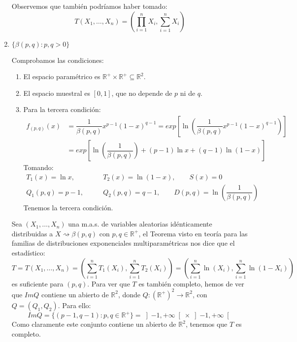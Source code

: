 \begin{ejercicio}
\begin{enumerate}[label=\alph*)]
            Observemos que también podríamos haber tomado:
            \begin{equation*}
                T(X_1, \ldots, X_n) = \left(\prod_{i=1}^n X_i, \sum_{i=1}^n X_i\right)
            \end{equation*}
        \item $\{\beta(p,q) : p,q>0\}$

            Comprobamos las condiciones:
            \begin{enumerate}[label=\arabic*.]
                \item El espacio paramétrico es $\mathbb{R}^+\times \mathbb{R}^+\subseteq \mathbb{R}^2$.
                \item El espacio muestral es $[0,1]$, que no depende de $p$ ni de $q$.
                \item Para la tercera condición:
                    \begin{align*}
                        f_{(p,q)}(x) &= \dfrac{1}{\beta(p,q)}x^{p-1}{(1-x)}^{q-1} = exp\left[\ln\left(\dfrac{1}{\beta(p,q)}x^{p-1}{(1-x)}^{q-1} \right)\right] \\
                                     &= exp\left[\ln\left(\dfrac{1}{\beta(p,q)}\right) + (p-1)\ln x + (q-1)\ln(1-x)\right]
                    \end{align*}
                Tomando:
                \begin{align*}
                    T_1(x) = \ln x, &\qquad T_2(x) = \ln(1-x), \qquad S(x) = 0 \\
                    Q_1(p,q) = p-1, &\qquad Q_2(p,q) = q-1, \qquad D(p,q) = \ln\left(\dfrac{1}{\beta(p,q)}\right) 
                \end{align*}
                Tenemos la tercera condición.
            \end{enumerate}
            Sea $(X_1, \ldots, X_n)$ una m.a.s. de variables aleatorias idénticamente distribuidas a $X\rightsquigarrow \beta(p,q)$ con $p,q\in \mathbb{R}^+$, el Teorema visto en teoría para las familias de distribuciones exponenciales multiparamétricas nos dice que el estadístico:
            \begin{equation*}
                T = T(X_1, \ldots, X_n) = \left(\sum_{i=1}^{n}T_1(X_i), \sum_{i=1}^{n}T_2(X_i)\right) = \left(\sum_{i=1}^{n}\ln(X_i), \sum_{i=1}^{n}\ln(1-X_i)\right)
            \end{equation*}
            es suficiente para $(p,q)$. Para ver que $T$ es también completo, hemos de ver que $Im Q$ contiene un abierto de $\mathbb{R}^2$, donde $Q:{(\mathbb{R}^+)}^{2}\to \mathbb{R}^2$, con $Q=(Q_1,Q_2)$. Para ello:
            \begin{equation*}
                Im Q = \{(p-1,q-1):p,q\in \mathbb{R}^+\} = \left]-1,+\infty\right[\times \left]-1,+\infty\right[
            \end{equation*}
            Como claramente este conjunto contiene un abierto de $\mathbb{R}^2$, tenemos que $T$ es completo.
    \end{enumerate}
\end{ejercicio}
